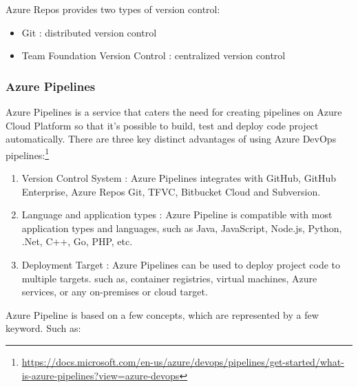 Azure Repos provides two types of version control:

\begin{itemize}
    \item Git : distributed version control
    \item Team Foundation Version Control : centralized version control
\end{itemize}
% 

\subsubsection{Azure Pipelines}
%
Azure Pipelines is a service that caters the need for creating pipelines on Azure Cloud Platform so that it's possible to build, test and deploy code project automatically. There are three key distinct advantages of using Azure DevOps pipelines:\footnote{\url{https://docs.microsoft.com/en-us/azure/devops/pipelines/get-started/what-is-azure-pipelines?view=azure-devops}}

 \begin{enumerate}
     \item Version Control System : Azure Pipelines integrates with GitHub, GitHub Enterprise, Azure Repos Git, TFVC, Bitbucket Cloud and Subversion.
     \item Language and application types : Azure Pipeline is compatible with most application types and languages, such as Java, JavaScript, Node.js, Python, .Net, C++, Go, PHP, etc.
     \item Deployment Target :  Azure Pipelines can be used to deploy project code to multiple targets. such as, container registries, virtual machines, Azure services, or any on-premises or cloud target.
 \end{enumerate}
 
 Azure Pipeline is based on a few concepts, which are represented by a few keyword. Such as:
 
